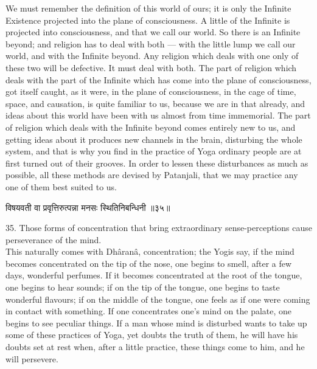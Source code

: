We must remember the definition of this world of ours; it is
only the Infinite Existence projected into the
plane of consciousness. A little of the Infinite is projected into
consciousness, and that we call our world. So there is an Infinite
beyond; and religion has to deal with both — with the little lump we
call our world, and with the Infinite beyond. Any religion which deals
with one only of these two will be defective. It must deal with both.
The part of religion which deals with the part of the Infinite which
has come into the plane of consciousness, got itself caught, as it
were, in the plane of consciousness, in the cage of time, space, and
causation, is quite familiar to us, because we are in that already, and
ideas about this world have been with us almost from time immemorial.
The part of religion which deals with the Infinite beyond comes
entirely new to us, and getting ideas about it produces new channels in
the brain, disturbing the whole system, and that is why you find in the
practice of Yoga ordinary people are at first turned out of their
grooves. In order to lessen these disturbances as much as possible, all
these methods are devised by Patanjali, that we may practice any one of
them best suited to us. \\

\begin{center}
\begin{sanskrit}
विषयवती वा प्रवृत्तिरुत्पन्ना मनसः
स्थितिनिबन्धिनी ॥३५॥
\end{sanskrit}
\end{center}
35. Those forms of concentration that bring extraordinary
sense-perceptions cause perseverance of the mind. \\

This naturally comes with Dhâranâ, concentration; the Yogis
say, if the mind becomes concentrated on the tip of the nose, one
begins to smell, after a few days, wonderful perfumes. If it becomes
concentrated at the root of the tongue, one begins to hear sounds; if
on the tip of the tongue, one begins to taste wonderful flavours; if on
the middle of the tongue, one feels as if one were coming in contact
with something. If one concentrates one's mind on the palate, one
begins to see peculiar things. If a man whose mind is disturbed wants
to take up some of these practices of Yoga, yet doubts the truth of
them, he will have his doubts
set at rest when, after a little practice, these things come to him,
and he will persevere. \\

